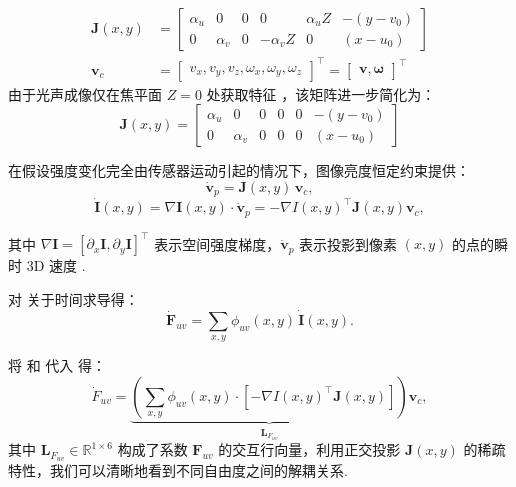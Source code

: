 \documentclass{article}
\begin{document}
\begin{equation}
\begin{aligned}
\mathbf{J}(x,y) &=
\begin{bmatrix}
\alpha_u & 0 & 0 & 0 & \alpha_u Z & -(y - v_0) \\
0 & \alpha_v & 0 & -\alpha_v Z & 0 & (x - u_0) 
\end{bmatrix} \\[1em]
\mathbf{v}_c &=
\begin{bmatrix}
v_x, v_y, v_z, \omega_x, \omega_y, \omega_z
\end{bmatrix}^\top = \begin{bmatrix} \mathbf{v}, \boldsymbol{\omega} \end{bmatrix}^\top
\end{aligned}
\label{eq:image_jacobian}
\end{equation}
由于光声成像仅在焦平面 $Z=0$ 处获取特征 ，该矩阵进一步简化为：
\begin{equation}
    \mathbf{J}(x, y) = \begin{bmatrix} \alpha_u & 0 & 0 & 0 & 0 & -(y - v_0) \\ 0 & \alpha_v & 0 & 0 & 0 & (x - u_0) \end{bmatrix}
\end{equation}


在假设强度变化完全由传感器运动引起的情况下，图像亮度恒定约束提供：
\begin{equation}
    \dot{\mathbf{v}}_p = \mathbf{J}(x,y) \, \mathbf{v}_c,
\label{eq:Jpixel}
\end{equation}
\begin{equation}
\dot{\boldsymbol{I}}(x,y) = \nabla \boldsymbol{I}(x,y) \cdot \dot{\mathbf{v}}_p = -\nabla I(x, y)^\top \mathbf{J}(x, y) \mathbf{v}_c,
\label{eq:dIdt}
\end{equation}

其中 $\nabla \boldsymbol{I} = \left[ \partial_x \boldsymbol{I}, \partial_y \boldsymbol{I}\right]^\top$ 表示空间强度梯度，$\dot{\mathbf{v}}_p$ 表示投影到像素 $(x,y)$ 的点的瞬时 3D 速度 \cite{chaumette2006visual}.


对  关于时间求导得：
\begin{equation}
\dot{\boldsymbol{F}}_{uv} = \sum_{x,y} \phi_{uv}(x,y) \, \dot{\boldsymbol{I}}(x,y).
\label{eq:dotF}
\end{equation}

将  和  代入  得：
\begin{equation}
\dot{F}_{uv} = \underbrace{\left( \sum_{x,y} \phi_{uv}(x,y) \cdot [-\nabla I(x,y)^\top \mathbf{J}(x,y)] \right)}_{\mathbf{L}_{F_{uv}}} \mathbf{v}_c,
\label{eq:LFuv}
\end{equation}
其中 $\boldsymbol{L}_{F_{uv}} \in \mathbb{R}^{1 \times 6}$ 构成了系数 $\boldsymbol{F}_{uv}$ 的交互行向量，利用正交投影 $\mathbf{J}(x, y)$ 的稀疏特性，我们可以清晰地看到不同自由度之间的解耦关系.
\end{document}
